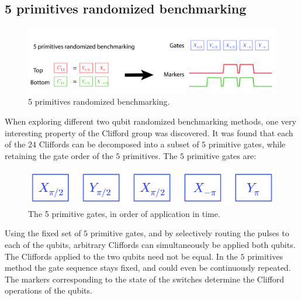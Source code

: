       \subsection{5 primitives randomized benchmarking}
        \label{ssec:5 primitives randomized benchmarking}

        \begin{figure}[h]
          \centering
          \includegraphics[width=\textwidth]{Figures/Randomized benchmarking/5 primitives RB.jpg}
          \caption{5 primitives randomized benchmarking.}
          \label{fig:5 primitives RB schematic}
        \end{figure}

        When exploring different two qubit randomized benchmarking methods, one very interesting property of the Clifford group was discovered. It was found that each of the $24$ Cliffords can be decomposed into a subset of $5$ primitive gates, while retaining the gate order of the $5$ primitives. The $5$ primitive gates are:

        \begin{figure}[h!]
          \centering
          \includegraphics[width=.5\textwidth]{Figures/Randomized benchmarking/5 primitive gates.jpg}
          \caption{The 5 primitive gates, in order of application in time.}
          \label{5 primitive gates}
        \end{figure}

        Using the fixed set of $5$ primitive gates, and by selectively routing the pulses to each of the qubits, arbitrary Cliffords can simultaneously be applied both qubits. The Cliffords applied to the two qubits need not be equal. In the $5$ primitives method the gate sequence stays fixed, and could even be continuously repeated. The markers corresponding to the state of the switches determine the Clifford operations of the qubits.

